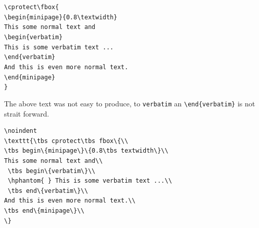 \documentclass[12pt,a4paper]{article}
\theoremstyle{definition}
\theoremstyle{remark}
\newcommand{\tbs}{\textbackslash}
\begin{document}
\begin{minipage}{0.55\textwidth}
\noindent
\texttt{\tbs cprotect\tbs fbox\{\\
\tbs begin\{minipage\}\{0.8\tbs textwidth\}\\
This some normal text and\\
 \tbs begin\{verbatim\}\\
 \hphantom{ } This is some verbatim text ...\\
 \tbs end\{verbatim\}\\
And this is even more normal text.\\
\tbs end\{minipage\}\\
\}}
\end{minipage}
\vline\hspace{0.5em}
\cprotect{}



\begin{center}
\begin{minipage}[c]{0.8 \textwidth}
The above text was not easy to produce, to \texttt{verbatim} an \texttt{\tbs end\{verbatim\}} is not strait forward.
\begin{verbatim}
\noindent
\texttt{\tbs cprotect\tbs fbox\{\\
\tbs begin\{minipage\}\{0.8\tbs textwidth\}\\
This some normal text and\\
 \tbs begin\{verbatim\}\\
 \hphantom{ } This is some verbatim text ...\\
 \tbs end\{verbatim\}\\
And this is even more normal text.\\
\tbs end\{minipage\}\\
\}
\end{verbatim}
\end{minipage}
\end{center}


\end{document}
